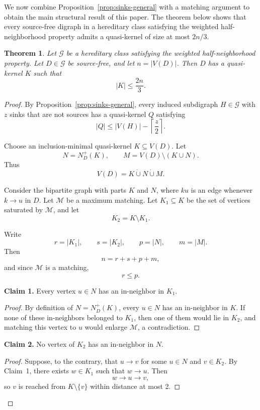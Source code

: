 \documentclass[11pt,a4paper]{article}
\newtheorem{theorem}{Theorem}[section]
\begin{document}
We now combine Proposition~\ref{prop:sinks-general} with a matching argument to obtain the main structural result of this paper. The theorem below shows that every source-free digraph in a hereditary class satisfying the weighted half-neighborhood property admits a quasi-kernel of size at most \(2n/3\).

\begin{theorem}\label{thm:general-2n3}
Let \(\mathcal G\) be a hereditary class satisfying the weighted
half-neighborhood property.
Let \(D\in\mathcal G\) be source-free, and let \(n=|V(D)|\).
Then \(D\) has a quasi-kernel \(K\) such that
\[
    |K|\le \frac{2n}{3}.
\]
\end{theorem}

\begin{proof}
By Proposition~\ref{prop:sinks-general}, every induced subdigraph
\(H\in\mathcal G\) with \(z\) sinks that are not sources
has a quasi-kernel \(Q\) satisfying
\[
    |Q|
    \le
    |V(H)|-\left\lceil\frac z2\right\rceil .
\]

Choose an inclusion-minimal quasi-kernel \(K\subseteq V(D)\). Let
\[
    N=N_D^+(K),
    \qquad
    M=V(D)\setminus (K\cup N).
\]
Thus
\[
    V(D)=K\dot\cup N\dot\cup M.
\]

Consider the bipartite graph with parts \(K\) and \(N\), where
\(ku\) is an edge whenever \(k\to u\) in \(D\).
Let \(\mathcal M\) be a maximum matching.
Let \(K_1\subseteq K\) be the set of vertices saturated by \(\mathcal M\),
and let
\[
    K_2=K\setminus K_1.
\]

Write
\[
    r=|K_1|,
    \qquad
    s=|K_2|,
    \qquad
    p=|N|,
    \qquad
    m=|M|.
\]
Then
\[
    n=r+s+p+m,
\]
and since \(\mathcal M\) is a matching,
\[
    r\le p.
\]

\medskip
\noindent\textbf{Claim 1.}
Every vertex \(u\in N\) has an in-neighbor in \(K_1\).

\begin{proof}
By definition of \(N=N_D^+(K)\), every \(u\in N\) has an in-neighbor in \(K\).
If none of these in-neighbors belonged to \(K_1\), then one of them would lie
in \(K_2\), and matching this vertex to \(u\) would enlarge \(\mathcal M\),
a contradiction.
\end{proof}

\medskip
\noindent\textbf{Claim 2.}
No vertex of \(K_2\) has an in-neighbor in \(N\).

\begin{proof}
Suppose, to the contrary, that \(u\to v\) for some \(u\in N\) and
\(v\in K_2\). By Claim~1, there exists \(w\in K_1\) such that \(w\to u\).
Then
\[
    w\to u\to v,
\]
so \(v\) is reached from \(K\setminus\{v\}\) within distance at most 2.


\end{proof}
\end{proof}
\end{document}
